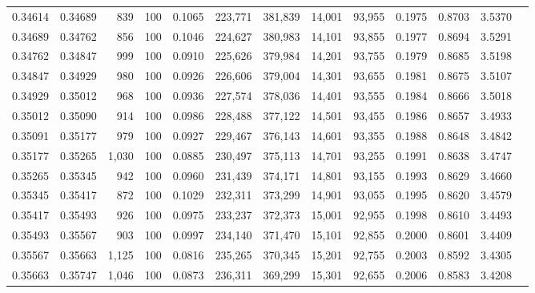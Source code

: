 \begin{tabular}{rrrrrrrrrrrrr}
0.34614 & 0.34689 &   839 & 100 &                                     0.1065 & 223,771 & 381,839 &  14,001 &  93,955 & 0.1975 & 0.8703 & 3.5370 \\
0.34689 & 0.34762 &   856 & 100 &                                     0.1046 & 224,627 & 380,983 &  14,101 &  93,855 & 0.1977 & 0.8694 & 3.5291 \\
0.34762 & 0.34847 &   999 & 100 &                                     0.0910 & 225,626 & 379,984 &  14,201 &  93,755 & 0.1979 & 0.8685 & 3.5198 \\
0.34847 & 0.34929 &   980 & 100 &                                     0.0926 & 226,606 & 379,004 &  14,301 &  93,655 & 0.1981 & 0.8675 & 3.5107 \\
0.34929 & 0.35012 &   968 & 100 &                                     0.0936 & 227,574 & 378,036 &  14,401 &  93,555 & 0.1984 & 0.8666 & 3.5018 \\
0.35012 & 0.35090 &   914 & 100 &                                     0.0986 & 228,488 & 377,122 &  14,501 &  93,455 & 0.1986 & 0.8657 & 3.4933 \\
0.35091 & 0.35177 &   979 & 100 &                                     0.0927 & 229,467 & 376,143 &  14,601 &  93,355 & 0.1988 & 0.8648 & 3.4842 \\
0.35177 & 0.35265 & 1,030 & 100 &                                     0.0885 & 230,497 & 375,113 &  14,701 &  93,255 & 0.1991 & 0.8638 & 3.4747 \\
0.35265 & 0.35345 &   942 & 100 &                                     0.0960 & 231,439 & 374,171 &  14,801 &  93,155 & 0.1993 & 0.8629 & 3.4660 \\
0.35345 & 0.35417 &   872 & 100 &                                     0.1029 & 232,311 & 373,299 &  14,901 &  93,055 & 0.1995 & 0.8620 & 3.4579 \\
0.35417 & 0.35493 &   926 & 100 &                                     0.0975 & 233,237 & 372,373 &  15,001 &  92,955 & 0.1998 & 0.8610 & 3.4493 \\
0.35493 & 0.35567 &   903 & 100 &                                     0.0997 & 234,140 & 371,470 &  15,101 &  92,855 & 0.2000 & 0.8601 & 3.4409 \\
0.35567 & 0.35663 & 1,125 & 100 &                                     0.0816 & 235,265 & 370,345 &  15,201 &  92,755 & 0.2003 & 0.8592 & 3.4305 \\
0.35663 & 0.35747 & 1,046 & 100 &                                     0.0873 & 236,311 & 369,299 &  15,301 &  92,655 & 0.2006 & 0.8583 & 3.4208 \\

\end{tabular}
